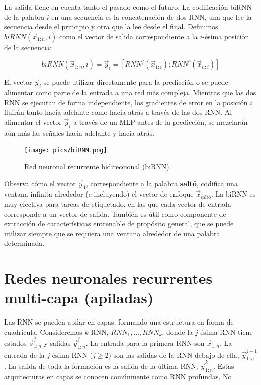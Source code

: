 La salida tiene en cuenta tanto el pasado como el futuro. La codificación biRNN de la palabra $i$ en una secuencia es la concatenación de dos RNN, una que lee la secuencia desde el principio y otra que la lee desde el final. Definimos $biRNN(\vec{x}_{1:n}, i)$ como el vector de salida correspondiente a la $i$-ésima posición de la secuencia:

\begin{displaymath}
biRNN(\vec{x}_{1:n}, i) = \vec{y}_i = [RNN^{f}(\vec{x}_{1:i});RNN^{b}(\vec{x}_{n:i})]
\end{displaymath}

El vector $\vec{y}_i$ se puede utilizar directamente para la predicción o se puede alimentar como parte de la entrada a una red más compleja. Mientras que las dos RNN se ejecutan de forma independiente, los gradientes de error en la posición $i$ fluirán tanto hacia adelante como hacia atrás a través de las dos RNN. Al alimentar el vector $\vec{y}_i$ a través de un MLP antes de la predicción, se mezclarán aún más las señales hacia adelante y hacia atrás.

\begin{figure}[h]
  \centering
  \texttt{[image: pics/biRNN.png]}
  \caption{Red neuronal recurrente bidireccional (biRNN).}
\end{figure}

Observa cómo el vector $\vec{y}_4$, correspondiente a la palabra \textbf{saltó}, codifica una ventana infinita alrededor (e incluyendo) el vector de enfoque $\vec{x}_{\text{saltó}}$. La biRNN es muy efectiva para tareas de etiquetado, en las que cada vector de entrada corresponde a un vector de salida. También es útil como componente de extracción de características entrenable de propósito general, que se puede utilizar siempre que se requiera una ventana alrededor de una palabra determinada.

\section{Redes neuronales recurrentes multi-capa (apiladas)}

Las RNN se pueden apilar en capas, formando una estructura en forma de cuadrícula. Consideremos $k$ RNN, $RNN_{1},\dots, RNN_{k}$, donde la $j$-ésima RNN tiene estados $\vec{s}_{1:n}^{j}$ y salidas $\vec{y}_{1:n}^{j}$. La entrada para la primera RNN son $\vec{x}_{1:n}$. La entrada de la $j$-ésima RNN ($j\geq 2$) son las salidas de la RNN debajo de ella, $\vec{y}_{1:n}^{j-1}$. La salida de toda la formación es la salida de la última RNN, $\vec{y}_{1:n}^k$. Estas arquitecturas en capas se conocen comúnmente como RNN profundas. No

